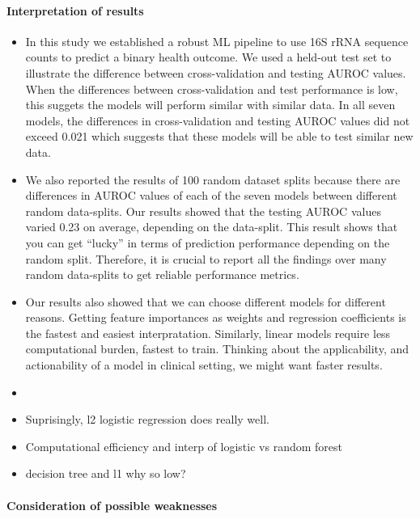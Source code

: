 \documentclass[11pt,]{article}
\let\oldparagraph\paragraph
\renewcommand{\paragraph}[1]{\oldparagraph{#1}\mbox{}}
\begin{document}
\paragraph{Interpretation of results}\label{interpretation-of-results}

\begin{itemize}
\item
  In this study we established a robust ML pipeline to use 16S rRNA
  sequence counts to predict a binary health outcome. We used a held-out
  test set to illustrate the difference between cross-validation and
  testing AUROC values. When the differences between cross-validation
  and test performance is low, this suggets the models will perform
  similar with similar data. In all seven models, the differences in
  cross-validation and testing AUROC values did not exceed 0.021 which
  suggests that these models will be able to test similar new data.
\item
  We also reported the results of 100 random dataset splits because
  there are differences in AUROC values of each of the seven models
  between different random data-splits. Our results showed that the
  testing AUROC values varied 0.23 on average, depending on the
  data-split. This result shows that you can get ``lucky'' in terms of
  prediction performance depending on the random split. Therefore, it is
  crucial to report all the findings over many random data-splits to get
  reliable performance metrics.
\item
  Our results also showed that we can choose different models for
  different reasons. Getting feature importances as weights and
  regression coefficients is the fastest and easiest interpratation.
  Similarly, linear models require less computational burden, fastest to
  train. Thinking about the applicability, and actionability of a model
  in clinical setting, we might want faster results.
\item
\item
  Suprisingly, l2 logistic regression does really well.
\item
  Computational efficiency and interp of logistic vs random forest
\item
  decision tree and l1 why so low?
\end{itemize}

\paragraph{Consideration of possible
weaknesses}\label{consideration-of-possible-weaknesses}
\end{document}
